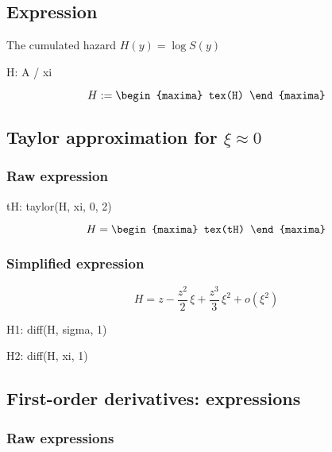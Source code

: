 \subsection{Expression}

The cumulated hazard $H(y) = \log S(y)$ 
\begin{maxima}
  H: A / xi
\end{maxima}

$$
H :=
\begin{maxima}
  tex(H)
\end{maxima}
$$

\subsection{Taylor approximation for $\xi \approx 0$}

\subsubsection*{Raw expression}
\begin{maxima}
  tH: taylor(H, xi, 0, 2)
\end{maxima}

{\color{MonVertF}
\begin{equation*}
  H = 
  \begin{maxima}
    tex(tH)
  \end{maxima}
\end{equation*}
}

\subsubsection*{Simplified expression}
{\color{red}
  \begin{equation}
    \label{eq:TH}
    H = z - \frac{z^2}{2}\, \xi +  \frac{z^3}{3}\, \xi^2 + o (\xi^2)
  \end{equation}
}
%
\begin{maxima}
  H1: diff(H, sigma, 1)
\end{maxima}%
\begin{maxima}
  H2: diff(H, xi, 1)
\end{maxima}%


\subsection{First-order derivatives: expressions}

\subsubsection*{Raw expressions}

